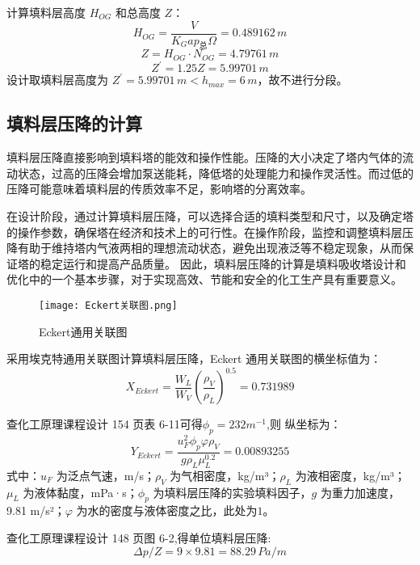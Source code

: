 计算填料层高度 $H_{OG}$ 和总高度 $Z$：
\begin{equation}
	H_{OG} = \frac{V}{K_{G}a p_{总} \Omega} = 0.489162 \, m
\end{equation}
\begin{equation}
	Z = H_{OG} \cdot N_{OG} = 4.79761 \, m
\end{equation}
\begin{equation}
	Z^{\prime} = 1.25Z = 5.99701 \, m
\end{equation}
设计取填料层高度为 $Z^{\prime} = 5.99701 \, m < h_{max} = 6 \, m$，故不进行分段。

\subsection{填料层压降的计算}
填料层压降直接影响到填料塔的能效和操作性能。压降的大小决定了塔内气体的流动状态，过高的压降会增加泵送能耗，降低塔的处理能力和操作灵活性。而过低的压降可能意味着填料层的传质效率不足，影响塔的分离效率。

在设计阶段，通过计算填料层压降，可以选择合适的填料类型和尺寸，以及确定塔的操作参数，确保塔在经济和技术上的可行性。在操作阶段，监控和调整填料层压降有助于维持塔内气液两相的理想流动状态，避免出现液泛等不稳定现象，从而保证塔的稳定运行和提高产品质量。 因此，填料层压降的计算是填料吸收塔设计和优化中的一个基本步骤，对于实现高效、节能和安全的化工生产具有重要意义。

\begin{figure}[ht]
	\centering
	\texttt{[image: Eckert关联图.png]}
	\caption{Eckert通用关联图}
\end{figure}

采用埃克特通用关联图计算填料层压降，Eckert 通用关联图的横坐标值为：
\begin{equation}
	X_{Eckert} = \frac{W_{L}}{W_{V}} \left( \frac{\rho_{V}}{\rho_{L}} \right)^{0.5} = 0.731989
\end{equation}

查化工原理课程设计 154 页表 6-11可得$\phi_{p}=232m^{-1}$,则
纵坐标为：
\begin{equation}
	Y_{Eckert} = \frac{u_F^2 \phi_{p} \varphi \rho_{V}}{g \rho_{L} \mu_{L}^{0.2}} = 0.00893255
\end{equation}
式中：$u_F$ 为泛点气速，m/s；$\rho_{V}$ 为气相密度，kg/m³；$\rho_{L}$ 为液相密度，kg/m³；$\mu_{L}$ 为液体黏度，mPa·s；$\phi_{p}$ 为填料层压降的实验填料因子，$g$ 为重力加速度，9.81 m/s²；$\varphi$ 为水的密度与液体密度之比，此处为$1$。

查化工原理课程设计 148 页图 6-2,得单位填料层压降:
\begin{equation}
	\Delta p/Z = 9 \times 9.81 = 88.29 \, Pa/m
\end{equation}

